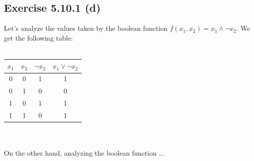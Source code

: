 \documentclass{exam}
\begin{document}
\subsection*{Exercise 5.10.1 (d)}                                                                                             
Let's analyze the values taken by the boolean function $f(x_1, x_2) = x_{1}\land \neg x_{2}$. We get the following table:\\   
\\                                                                                                                            
\begin{tabular}{|c c c c|}                                                                                                    
    \hline                                                                                                                    
    $x_1$ & $x_2$ & $\neg x_2$ & $x_{1}\lor \neg x_{2}$ \\ [0.5ex]                                                            
    \hline                                                                                                                    
    0     & 0     & 1      & 1 \\                                                                                             
    \hline                                                                                                                    
    0     & 1     & 0      & 0 \\                                                                                             
    \hline                                                                                                                    
    1     & 0     & 1      & 1 \\                                                                                             
    \hline                                                                                                                    
    1     & 1     & 0      & 1 \\                                                                                             
    \hline                                                                                                                    
\end{tabular}\\
\\
On the other hand, analyzing the boolean function ...\\
\end{document}
